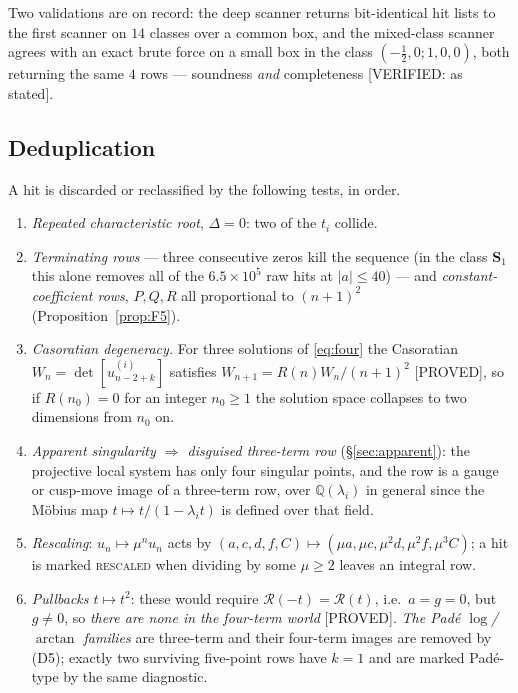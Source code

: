 \documentclass[11pt,reqno]{amsart}
\theoremstyle{plain}
\theoremstyle{definition}
\theoremstyle{remark}
\theoremstyle{plain}
\newcommand{\Q}{\mathbb{Q}}
\newcommand{\Rc}{\mathcal R}
\newcommand{\Proved}{\textup{\textsf{[PROVED]}}}
\newcommand{\Verified}[1]{\textup{\textsf{[VERIFIED: #1]}}}
\begin{document}
Two validations are on record: the deep scanner returns bit-identical hit lists
to the first scanner on $14$ classes over a common box, and the mixed-class
scanner agrees with an exact brute force on a small box in the class
$(-\tfrac12,0;1,0,0)$, both returning the same $4$ rows --- soundness \emph{and}
completeness \Verified{as stated}.

\subsection{Deduplication}\label{sec:dedup}
A hit is discarded or reclassified by the following tests, in order.
\begin{enumerate}[leftmargin=3.1em]
\item[(D1)] \emph{Repeated characteristic root}, $\Delta=0$: two of the $t_i$
collide.
\item[(D2), (D3)] \emph{Terminating rows} --- three consecutive zeros kill the
sequence (in the class $\mathbf S_1$ this alone removes all of the
$6.5\times10^5$ raw hits at $|a|\le40$) --- and \emph{constant-coefficient rows},
$P,Q,R$ all proportional to $(n+1)^2$ (Proposition~\ref{prop:F5}).
\item[(D4)] \emph{Casoratian degeneracy.} For three solutions of \eqref{eq:four} the
Casoratian $W_n=\det[u^{(i)}_{n-2+k}]$ satisfies $W_{n+1}=R(n)W_n/(n+1)^2$
\Proved, so if $R(n_0)=0$ for an integer $n_0\ge1$ the solution space collapses
to two dimensions from $n_0$ on.
\item[(D5)] \emph{Apparent singularity $\Rightarrow$ disguised three-term row}
(\S\ref{sec:apparent}): the projective local system has only four singular
points, and the row is a gauge or cusp-move image of a three-term row, over
$\Q(\lambda_i)$ in general since the M\"obius map $t\mapsto t/(1-\lambda_it)$ is
defined over that field.
\item[(D6)] \emph{Rescaling}: $u_n\mapsto\mu^nu_n$ acts by
$(a,c,d,f,C)\mapsto(\mu a,\mu c,\mu^2d,\mu^2f,\mu^3C)$; a hit is marked
\textsc{rescaled} when dividing by some $\mu\ge2$ leaves an integral row.
\item[(D7), (D8)] \emph{Pullbacks $t\mapsto t^2$}: these would require $\Rc(-t)=\Rc(t)$,
i.e.\ $a=g=0$, but $g\ne0$, so \emph{there are none in the four-term world}
\Proved. \emph{The Pad\'e $\log$/$\arctan$ families} are three-term and their
four-term images are removed by (D5); exactly two surviving five-point rows have
$k=1$ and are marked Pad\'e-type by the same diagnostic.
\end{enumerate}
\end{document}
